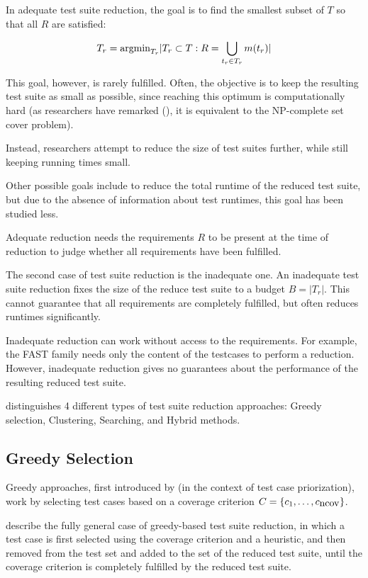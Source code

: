 In adequate test suite reduction, the goal is to find the smallest subset
of $T$ so that all $R$ are satisfied:

$$T_{r}=\hbox{argmin}_{T_{r}} |T_{r} \subset T: R=\bigcup_{t_{r} \in T_{r}} m(t_{r})|$$

This goal, however, is rarely fulfilled. Often, the objective is to
keep the resulting test suite as small as possible, since reaching
this optimum is computationally hard (as researchers have remarked
(\cite{khan2016survey}), it is equivalent to the NP-complete set cover
problem). %

Instead, researchers attempt to reduce the size of test suites further,
while still keeping running times small.

Other possible goals include to reduce the total runtime of the reduced
test suite, but due to the absence of information about test runtimes,
this goal has been studied less. %

Adequate reduction needs the requirements $R$ to be present at the time
of reduction to judge whether all requirements have been fulfilled.

The second case of test suite reduction is the inadequate one. An
inadequate test suite reduction fixes the size of the reduce test suite
to a budget $B=|T_{r}|$. This cannot guarantee that all requirements
are completely fulfilled, but often reduces runtimes significantly.

Inadequate reduction can work without access to the requirements.
For example, the FAST family needs only the content of the testcases to
perform a reduction. However, inadequate reduction gives no guarantees
about the performance of the resulting reduced test suite.

\cite{khan2018systematic} distinguishes 4 different types of test
suite reduction approaches: Greedy selection, Clustering, Searching,
and Hybrid methods.

\subsection{Greedy Selection}

Greedy approaches, first introduced by \cite{rothermel2001prioritizing}
(in the context of test case priorization), work by selecting test cases
based on a coverage criterion $C=\{c_1, \dots, c_{\hbox{ncov}}\}$.

\cite{khan2018systematic} describe the fully general case of greedy-based
test suite reduction, in which a test case is first selected using
the coverage criterion and a heuristic, and then removed from the test
set and added to the set of the reduced test suite, until the coverage
criterion is completely fulfilled by the reduced test suite.

